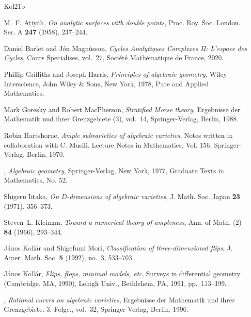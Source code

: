 \documentclass{amsart}
\theoremstyle{definition}
\theoremstyle{remark}
\begin{document}
\begin{thebibliography}{Kol21b}

M.~F. Atiyah, \emph{On analytic surfaces with double points}, Proc. Roy. Soc.
  London. Ser. A \textbf{247} (1958), 237--244. 

Daniel Barlet and J\'on Magn\'usson, \emph{Cycles {A}nalytiques {C}omplexes
  {II}: {L}’espace des {C}ycles}, Cours Specialises, vol.~27, Soci\'et\'e
  Math\'ematique de France, 2020.

Phillip Griff{i}ths and Joseph Harris, \emph{Principles of algebraic geometry},
  Wiley-Interscience, John Wiley \& Sons, New York, 1978, Pure and Applied
  Mathematics. 

Mark Goresky and Robert MacPherson, \emph{Stratified {M}orse theory},
  Ergebnisse der Mathematik und ihrer Grenzgebiete (3), vol.~14,
  Springer-Verlag, Berlin, 1988.

Robin Hartshorne, \emph{Ample subvarieties of algebraic varieties}, Notes
  written in collaboration with C. Musili. Lecture Notes in Mathematics, Vol.
  156, Springer-Verlag, Berlin, 1970. 

\bysame, \emph{Algebraic geometry}, Springer-Verlag, New York, 1977, Graduate
  Texts in Mathematics, No. 52. 

Shigeru Iitaka, \emph{On {$D$}-dimensions of algebraic varieties}, J. Math.
  Soc. Japan \textbf{23} (1971), 356--373. 

Steven~L. Kleiman, \emph{Toward a numerical theory of ampleness}, Ann. of Math.
  (2) \textbf{84} (1966), 293--344. 

J{\'a}nos Koll{\'a}r and Shigefumi Mori, \emph{Classification of
  three-dimensional flips}, J. Amer. Math. Soc. \textbf{5} (1992), no.~3,
  533--703. 

J{\'a}nos Koll{\'a}r, \emph{Flips, flops, minimal models, etc}, Surveys in
  differential geometry ({C}ambridge, {MA}, 1990), Lehigh Univ., Bethlehem, PA,
  1991, pp.~113--199. 

\bysame, \emph{Rational curves on algebraic varieties}, Ergebnisse der
  Mathematik und ihrer Grenzgebiete. 3. Folge., vol.~32, Springer-Verlag,
  Berlin, 1996.


\end{thebibliography}
\end{document}
